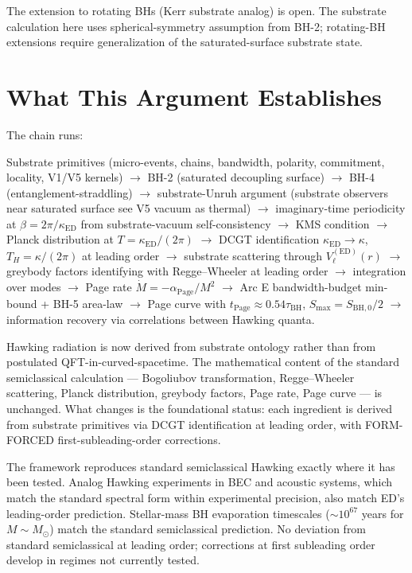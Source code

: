 \documentclass[11pt,a4paper]{article}
\begin{document}
The extension to rotating BHs (Kerr substrate analog) is open. The substrate calculation here uses spherical-symmetry assumption from BH-2; rotating-BH extensions require generalization of the saturated-surface substrate state.

\section{What This Argument Establishes}

The chain runs:

Substrate primitives (micro-events, chains, bandwidth, polarity, commitment, locality, V1/V5 kernels) $\to$ BH-2 (saturated decoupling surface) $\to$ BH-4 (entanglement-straddling) $\to$ substrate-Unruh argument (substrate observers near saturated surface see V5 vacuum as thermal) $\to$ imaginary-time periodicity at $\beta = 2\pi/\kappa_{\mathrm{ED}}$ from substrate-vacuum self-consistency $\to$ KMS condition $\to$ Planck distribution at $T = \kappa_{\mathrm{ED}}/(2\pi)$ $\to$ DCGT identification $\kappa_{\mathrm{ED}} \to \kappa$, $T_H = \kappa/(2\pi)$ at leading order $\to$ substrate scattering through $V_\ell^{(\mathrm{ED})}(r)$ $\to$ greybody factors identifying with Regge--Wheeler at leading order $\to$ integration over modes $\to$ Page rate $\dot M = -\alpha_{\mathrm{Page}}/M^2$ $\to$ Arc E bandwidth-budget min-bound + BH-5 area-law $\to$ Page curve with $t_{\mathrm{Page}} \approx 0.54\tau_{\mathrm{BH}}$, $S_{\max} = S_{\mathrm{BH},0}/2$ $\to$ information recovery via correlations between Hawking quanta.

Hawking radiation is now derived from substrate ontology rather than from postulated QFT-in-curved-spacetime. The mathematical content of the standard semiclassical calculation --- Bogoliubov transformation, Regge--Wheeler scattering, Planck distribution, greybody factors, Page rate, Page curve --- is unchanged. What changes is the foundational status: each ingredient is derived from substrate primitives via DCGT identification at leading order, with FORM-FORCED first-subleading-order corrections.

The framework reproduces standard semiclassical Hawking exactly where it has been tested. Analog Hawking experiments in BEC and acoustic systems, which match the standard spectral form within experimental precision, also match ED's leading-order prediction. Stellar-mass BH evaporation timescales ($\sim 10^{67}$ years for $M \sim M_\odot$) match the standard semiclassical prediction. No deviation from standard semiclassical at leading order; corrections at first subleading order develop in regimes not currently tested.
\end{document}

